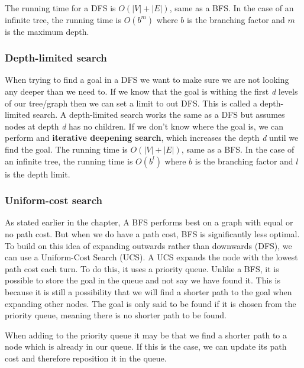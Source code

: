 \documentclass[]{final_report}
\begin{document}
The running time for a DFS is $O(|V| + |E|)$, same as a BFS. In the case of an infinite tree, the running time is $O(b^m)$ where $b$ is the branching factor and $m$ is the maximum depth.

\subsubsection{Depth-limited search} \label{Depth-limited search}

When trying to find a goal in a DFS we want to make sure we are not looking any deeper than we need to. If we know that the goal is withing the first \textit{d} levels of our tree/graph then we can set a limit to out DFS. This is called a depth-limited search. A depth-limited search works the same as a DFS but assumes nodes at depth \textit{d} has no children. If we don't know where the goal is, we can perform and \textbf{iterative deepening search}, which increases the depth \textit{d} until we find the goal. The running time is $O(|V| + |E|)$, same as a BFS. In the case of an infinite tree, the running time is $O(b^l)$ where $b$ is the branching factor and $l$ is the depth limit.

\subsubsection{Uniform-cost search}

As stated earlier in the chapter, A BFS performs best on a graph with equal or no path cost. But when we do have a path cost, BFS is significantly less optimal. To build on this idea of expanding outwards rather than downwards (DFS), we can use a Uniform-Cost Search (UCS). A UCS expands the node with the lowest path cost each turn. To do this, it uses a priority queue. Unlike a BFS, it is possible to store the goal in the queue and not say we have found it. This is because it is still a possibility that we will find a shorter path to the goal when expanding other nodes. The goal is only said to be found if it is chosen from the priority queue, meaning there is no shorter path to be found. 

When adding to the priority queue it may be that we find a shorter path to a node which is already in our queue. If this is the case, we can update its path cost and therefore reposition it in the queue.
\end{document}
